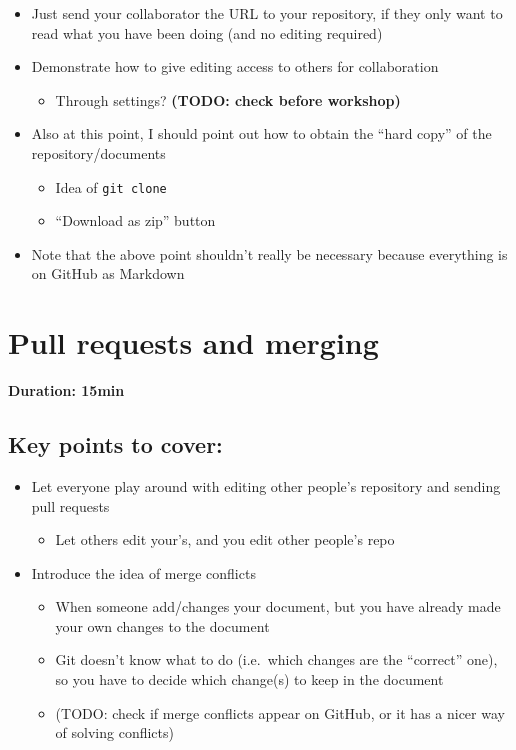 \documentclass[a4paper, 12pt, oneside]{report} %
\begin{document}
\begin{itemize}
	\item Just send your collaborator the URL to your repository, if they only want to read what you have been doing (and no editing required)
	\item Demonstrate how to give editing access to others for collaboration
		\begin{itemize}
			\item Through settings? \textbf{(TODO: check before workshop)}
		\end{itemize}
	\item Also at this point, I should point out how to obtain the ``hard copy'' of the repository/documents
		\begin{itemize}
			\item Idea of \texttt{git clone}
			\item ``Download as zip'' button
		\end{itemize}
	\item Note that the above point shouldn't really be necessary because everything is on GitHub as Markdown
\end{itemize}


\section{Pull requests and merging}
\label{sec:pull_requests_and_merging}


{\bfseries Duration: 15min}

\subsection*{Key points to cover:}

\begin{itemize}
	\item Let everyone play around with editing other people's repository and sending pull requests
		\begin{itemize}
			\item Let others edit your's, and you edit other people's repo
		\end{itemize}
	\item Introduce the idea of merge conflicts
		\begin{itemize}
			\item When someone add/changes your document, but you have already made your own changes to the document
			\item Git doesn't know what to do (i.e.\ which changes are the ``correct'' one), so you have to decide which change(s) to keep in the document
			\item (TODO: check if merge conflicts appear on GitHub, or it has a nicer way of solving conflicts)
		\end{itemize}
\end{itemize}
\end{document}
